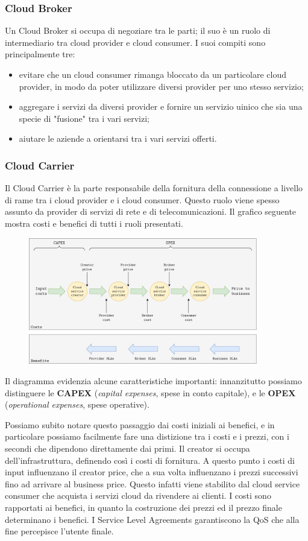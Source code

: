 \subsubsection{Cloud Broker}
Un Cloud Broker si occupa di negoziare tra le parti; il suo è un ruolo di intermediario tra cloud provider e cloud consumer. I suoi compiti sono principalmente tre:
\begin{itemize}
    \item evitare che un cloud consumer rimanga bloccato da un particolare cloud provider, in modo da poter utilizzare diversi provider per uno stesso servizio;
    \item aggregare i servizi da diversi provider e fornire un servizio uinico che sia una specie di "fusione" tra i vari servizi;
    \item aiutare le aziende a orientarsi tra i vari servizi offerti.
\end{itemize}
\subsubsection{Cloud Carrier}
Il Cloud Carrier è la parte responsabile della fornitura della connessione a livello di rame tra i cloud provider e i cloud consumer. Questo ruolo viene spesso assunto da provider di servizi di rete e di telecomunicazioni.
Il grafico seguente mostra costi e benefici di tutti i ruoli presentati.

\begin{figure}[ht]
    \centering
    \includegraphics[width=10cm]{./Images/cap3/3.1.png}
    \label{fig:image3.1}
\end{figure}

Il diagramma evidenzia alcune caratteristiche importanti: innanzitutto possiamo distinguere le \textbf{CAPEX} (\textit{capital expenses}, spese in conto capitale), e le \textbf{OPEX} (\textit{operational expenses}, spese operative). 

Possiamo subito notare questo passaggio dai costi iniziali ai benefici, e in particolare possiamo facilmente fare una distizione tra i costi e i prezzi, con i secondi che dipendono direttamente dai primi.
Il creator si occupa dell'infrastruttura, definendo così i costi di fornitura. A questo punto i costi di input influenzano il creator price, che a sua volta influenzano i prezzi successivi fino ad arrivare al business price. Questo infatti viene stabilito dal cloud service consumer che acquista i servizi cloud da rivendere ai clienti. I costi sono rapportati ai benefici, in quanto la costruzione dei prezzi ed il prezzo finale determinano i benefici. I Service Level Agreements garantiscono la QoS che alla fine percepisce l'utente finale.

